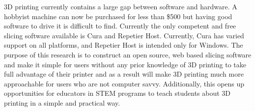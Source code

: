% 
% 
%

3D printing currently contains a large gap between software and hardware. 
A hobbyist machine can now be purchased for less than \$500 but having good software to drive it is difficult to find. 
Currently the only competent and free slicing software available is Cura and Repetier Host. 
Currently, Cura has varied support on all platforms, and Repetier Host is intended only for Windows. 
The purpose of this research is to construct an open source, web based slicing software and make it simple for users without any prior knowledge of 3D printing to take full advantage of their printer and as a result will make 3D printing much more approachable for users who are not computer savvy. 
Additionally, this opens up opportunities for educators in STEM programs to teach students about 3D printing in a simple and practical way.
